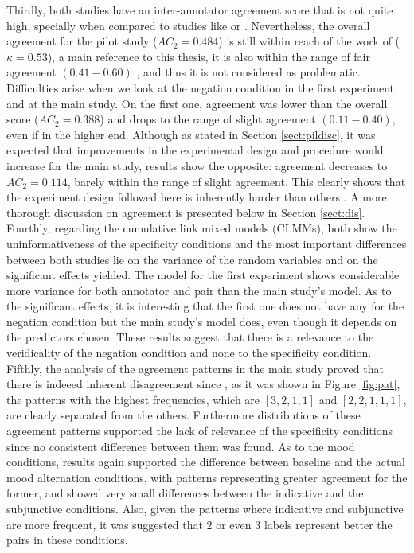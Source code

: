 Thirdly, both studies have an inter-annotator agreement score that is not quite high, specially when compared to studies like \citet{sauri2009factbank} or \citet{ross2019well}. Nevertheless, the overall agreement for the pilot study ($AC_2=0.484$) is still within reach of the work of \citet{de2012did} ($\kappa = 0.53$), a main reference to this thesis, it is also within the range of fair agreement $(0.41-0.60)$ \citep{shrout1998measurement}, and thus it is not considered as problematic. Difficulties arise when we look at the negation condition in the first experiment and at the main study. On the first one, agreement was lower than the overall score ($AC_2=0.388$) and drops to the range of slight agreement $(0.11-0.40)$, even if in the higher end. Although as stated in Section \ref{sect:pildisc}, it was expected that improvements in the experimental design and procedure would increase for the main study, results show the opposite: agreement decreases to $AC_2=0.114$, barely within the range of slight agreement. This clearly shows that the experiment design followed here is inherently harder than others \citep{pavlick2019inherent}. A more thorough discussion on agreement is presented below in Section \ref{sect:dis}.\\

Fourthly, regarding the cumulative link mixed models (CLMMs), both show the uninformativeness of the specificity conditions and the most important differences between both studies lie on the variance of the random variables and on the significant effects yielded. The model for the first experiment shows considerable more variance for both annotator and pair than the main study's model. As to the significant effects, it is interesting that the first one does not have any for the negation condition but the main study's model does, even though it depends on the predictors chosen. These results suggest that there is a relevance to the veridicality of the negation condition and none to the specificity condition.\\

Fifthly, the analysis of the agreement patterns in the main study proved that there is indeeed inherent disagreement since , as it was shown in Figure \ref{fig:pat}, the patterns with the highest frequencies, which are $[3,2,1,1]$ and $[2,2,1,1,1]$, are clearly separated from the others. Furthermore distributions of these agreement patterns supported the lack of relevance of the specificity conditions since no consistent difference between them was found. As to the mood conditions, results again supported the difference between baseline and the actual mood alternation conditions, with patterns representing greater agreement for the former, and showed very small differences between the indicative and the subjunctive conditions. Also, given the patterns where indicative and subjunctive are more frequent, it was suggested that $2$ or even $3$ labels represent better the pairs in these conditions.\\

